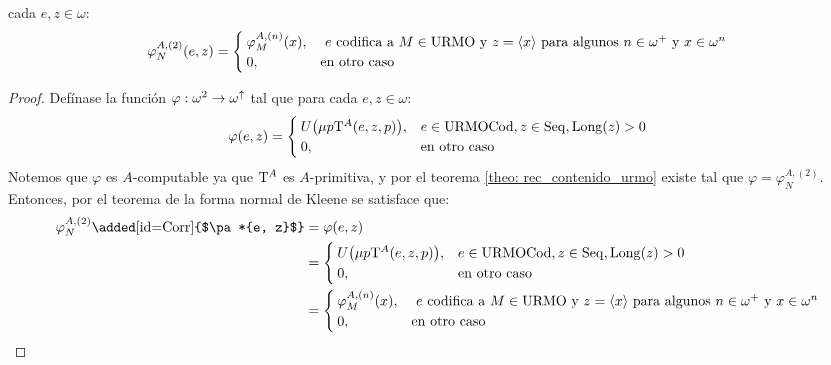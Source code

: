 \begin{agregado}
\begin{theorem}
	\label{theo: maquina_universal_relativizada}
	 cada $e, z\in\omega$:
	\[
		\varphi_{N}^{A, (2)}\pa*{e, z} =
		\begin{cases}
			\varphi_{M}^{A, (n)}\pa*{x}, &\text{ $e$ codifica a $M\in\URMO$ y $z =\inner*{x}$ para algunos $n\in\omega^{+}$ y $x\in\omega^{n}$}\\
			0, &\text{en otro caso}
		\end{cases}
	\]
\end{theorem}

\begin{proof}
	Defínase la función $\varphi:\omega^{2}\to\omega^{\DIVERGE}$ tal que para cada $e, z\in\omega$:
	\[
		\varphi\pa*{e, z} =
		\begin{cases}
			U\pa*{\mu p\KLEENE[A]\pa*{e, z, p}}, & e\in\URMOCODIGO, z\in\SECUENCIAS,\LONGITUD\pa*{z} > 0\\
			0, &\text{en otro caso}
		\end{cases}
	\]
	Notemos que $\varphi$ es $A$-computable ya que $\KLEENE[A]$ es $A$-primitiva, y por el teorema \ref{theo: rec_contenido_urmo} existe  tal que $\varphi =\varphi_{N}^{A, (2)}$.  Entonces, por el teorema de la forma normal de Kleene  se satisface que:
	\begin{align*}
		\varphi_{N}^{A, (2)}\mbox{\added[id=Corr]{$\pa*{e, z}$}} &=\varphi\pa*{e, z}\\
		&=
		\begin{cases}
			U\pa*{\mu p\KLEENE[A]\pa*{e, z, p}}, & e\in\URMOCODIGO, z\in\SECUENCIAS,\LONGITUD\pa*{z} > 0\\
			0, &\text{en otro caso}
		\end{cases}
		\\
		&=
		\begin{cases}
			\varphi_{M}^{A, (n)}\pa*{x}, &\text{ $e$ codifica a $M\in\URMO$ y $z =\inner*{x}$ para algunos $n\in\omega^{+}$ y $x\in\omega^{n}$}\\
			0, &\text{en otro caso}
		\end{cases}
	\end{align*}
\end{proof}


\end{agregado}

